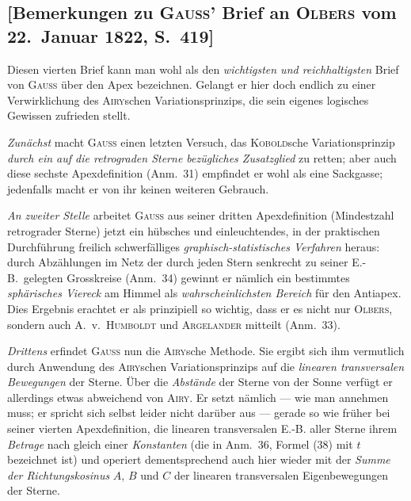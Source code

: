 \documentclass[12pt,a4paper]{article}
\theoremstyle{plain}
\theoremstyle{definition}
\theoremstyle{remark}
\begin{document}
\newpage
\subsection*{[Bemerkungen zu \textsc{Gauss'} Brief an \textsc{Olbers} vom 22.~Januar 1822, S.~419]}

\begin{small}
Diesen vierten Brief kann man wohl als den \textit{wichtigsten und reichhaltigsten}
Brief von \textsc{Gauss} \"uber den Apex bezeichnen. Gelangt er hier doch endlich zu
einer Verwirklichung des \textsc{Airy}schen Variationsprinzips, die sein eigenes
logisches Gewissen zufrieden stellt.

\textit{Zun\"achst} macht \textsc{Gauss} einen letzten Versuch, das \textsc{Kobold}sche Variationsprinzip
\textit{durch ein auf die retrograden Sterne bez\"ugliches Zusatzglied} zu retten; aber
auch diese sechste Apexdefinition (Anm.~31) empfindet er wohl als eine Sackgasse;
jedenfalls macht er von ihr keinen weiteren Gebrauch.

\textit{An zweiter Stelle} arbeitet \textsc{Gauss} aus seiner dritten Apexdefinition
(Mindestzahl retrograder Sterne) jetzt ein h\"ubsches und einleuchtendes, in der
praktischen Durchf\"uhrung freilich schwerf\"alliges \textit{graphisch-statistisches
Verfahren} heraus: durch Abz\"ahlungen im Netz der durch jeden Stern senkrecht
zu seiner E.-B.~gelegten Grosskreise (Anm.~34) gewinnt er n\"amlich ein bestimmtes
\textit{sph\"arisches Viereck} am Himmel als \textit{wahrscheinlichsten Bereich} f\"ur den
Antiapex. Dies Ergebnis erachtet er als prinzipiell so wichtig, dass er es nicht
nur \textsc{Olbers}, sondern auch A.~v.~\textsc{Humboldt} und \textsc{Argelander} mitteilt
(Anm.~33).

\textit{Drittens} erfindet \textsc{Gauss} nun die \textsc{Airy}sche Methode. Sie ergibt sich ihm
vermutlich durch Anwendung des \textsc{Airy}schen Variationsprinzips auf die \textit{linearen
transversalen Bewegungen} der Sterne. \"Uber die \textit{Abst\"ande} der Sterne von der
Sonne verf\"ugt er allerdings etwas abweichend von \textsc{Airy}. Er setzt n\"amlich ---
wie man annehmen muss; er spricht sich selbst leider nicht dar\"uber aus --- gerade
so wie fr\"uher bei seiner vierten Apexdefinition, die linearen transversalen E.-B.
aller Sterne ihrem \textit{Betrage} nach gleich einer \textit{Konstanten} (die in Anm.~36,
Formel (38) mit $t$ bezeichnet ist) und operiert dementsprechend auch hier wieder
mit der \textit{Summe der Richtungskosinus} $A$, $B$ und $C$ der linearen transversalen
Eigenbewegungen der Sterne.


\end{small}
\end{document}
